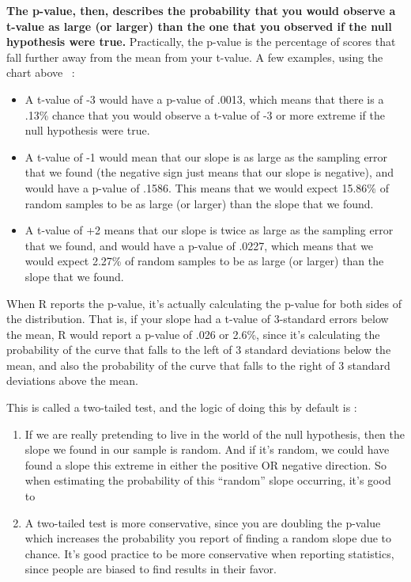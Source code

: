\documentclass[
  letterpaper,
  DIV=11,
  numbers=noendperiod,
  oneside]{scrreprt}
\begin{document}
\textbf{The p-value, then, describes the probability that you would
observe a t-value as large (or larger) than the one that you observed if
the null hypothesis were true.} Practically, the p-value is the
percentage of scores that fall further away from the mean from your
t-value. A few examples, using the chart above~ :

\begin{itemize}
\item
  A t-value of -3 would have a p-value of .0013, which means that there
  is a .13\% chance that you would observe a t-value of -3 or more
  extreme if the null hypothesis were true.
\item
  A t-value of -1 would mean that our slope is as large as the sampling
  error that we found (the negative sign just means that our slope is
  negative), and would have a p-value of .1586. This means that we would
  expect 15.86\% of random samples to be as large (or larger) than the
  slope that we found.~
\item
  A t-value of +2 means that our slope is twice as large as the sampling
  error that we found, and would have a p-value of .0227, which means
  that we would expect 2.27\% of random samples to be as large (or
  larger) than the slope that we found.~
\end{itemize}

When R reports the p-value, it's actually calculating the p-value for
both sides of the distribution. That is, if your slope had a t-value of
3-standard errors below the mean, R would report a p-value of .026 or
2.6\%, since it's calculating the probability of the curve that falls to
the left of 3 standard deviations below the mean, and also the
probability of the curve that falls to the right of 3 standard
deviations above the mean.

This is called a two-tailed test, and the logic of doing this by default
is :~

\begin{enumerate}
\def\labelenumi{\arabic{enumi}.}
\item
  If we are really pretending to live in the world of the null
  hypothesis, then the slope we found in our sample is random. And if
  it's random, we could have found a slope this extreme in either the
  positive OR negative direction. So when estimating the probability of
  this ``random'' slope occurring, it's good to~
\item
  A two-tailed test is more conservative, since you are doubling the
  p-value which increases the probability you report of finding a random
  slope due to chance. It's good practice to be more conservative when
  reporting statistics, since people are biased to find results in their
  favor.~
\end{enumerate}
\end{document}
